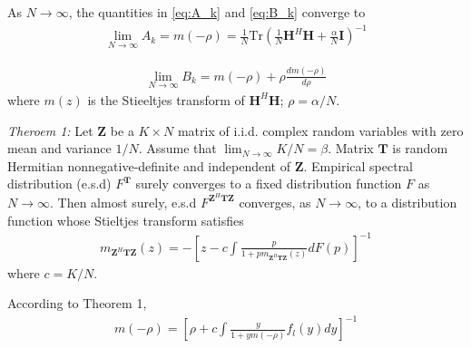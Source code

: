 \documentclass[12pt,journal,draftclsnofoot,onecolumn]{IEEEtran}
\begin{document}
As $N \to \infty$, the quantities in \eqref{eq:A_k} and \eqref{eq:B_k} converge to
\begin{eqnarray}
\lim_{N \to \infty}A_k = m(-\rho) = \frac{1}{N}\mathrm{Tr}\left(\frac{1}{N}\mathbf{H}^H\mathbf{H} + \frac{\alpha}{N}\mathbf{I}\right)^{-1} 
\end{eqnarray}

\begin{eqnarray}
\lim_{N \to \infty}B_k = m(-\rho) +\rho\frac{dm(-\rho)}{d\rho}
\end{eqnarray}
where $m(z)$ is the Stieeltjes transform of $\mathbf{H}^H\mathbf{H}$; $\rho = \alpha/N$.
%



\emph{Theroem 1:} Let $\mathbf{Z}$ be a $K \times N$ matrix of i.i.d. complex
random variables with zero mean and variance  $1/N$.  Assume
that $\lim_{N \to \infty}K/N = \beta$. Matrix $\mathbf{T}$ is random Hermitian
nonnegative-definite and independent of $\mathbf{Z}$. Empirical spectral distribution (e.s.d) $F^{\mathbf{T}}$ surely converges to a fixed distribution function $F$ as $N \to \infty$. Then almost surely, e.s.d $F^{\mathbf{Z}^H\mathbf{T}\mathbf{Z}}$ converges, as $N \to \infty$,
to a distribution function whose Stieltjes transform
satisfies
\begin{eqnarray}
m_{\mathbf{Z}^H\mathbf{T}\mathbf{Z}}(z) = -\left[z-c\int \frac{p}{1+pm_{\mathbf{Z}^H\mathbf{T}\mathbf{Z}}(z)}dF(p)\right]^{-1}
\end{eqnarray}
where $c = K/N$.

According to Theorem 1, 
\begin{eqnarray}
m(-\rho) = \left[\rho+c\int \frac{y}{1+ym(-\rho)}f_l(y)dy\right]^{-1} \label{eq:m_rho}
\end{eqnarray}
\end{document}
